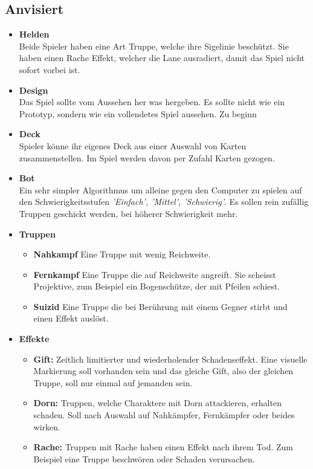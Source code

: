 \subsection*{Anvisiert}
\begin{itemize}
    \item \textbf{Helden} \\
        Beide Spieler haben eine Art Truppe, welche ihre Sigelinie beschützt. Sie haben einen Rache Effekt, welcher die
        Lane ausradiert, damit das Spiel nicht sofort vorbei ist.
    \item \textbf{Design} \\
        Das Spiel sollte vom Aussehen her was hergeben. Es sollte nicht wie ein Prototyp, sondern wie ein 
        vollendetes Spiel aussehen. Zu beginn
    \item \textbf{Deck} \\
        Spieler könne ihr eigenes Deck aus einer Auswahl von Karten zusammenstellen. Im Spiel werden davon per Zufahl Karten gezogen.
    \item \textbf{Bot} \\
        Ein sehr simpler Algorithmus um alleine gegen den Computer zu spielen auf den Schwierigkeitsstufen \textit{'Einfach', 'Mittel', 'Schwierig'}.
        Es sollen rein zufällig Truppen geschickt werden, bei höherer Schwierigkeit mehr.
    \item \textbf{Truppen}
    \begin{itemize}
        \item \textbf{Nahkampf}
            Eine Truppe mit wenig Reichweite.
        \item \textbf{Fernkampf}
            Eine Truppe die auf Reichweite angreift. Sie scheisst Projektive, zum Beispiel ein Bogenschütze,
            der mit Pfeilen schiest.
        \item \textbf{Suizid}
            Eine Truppe die bei Berührung mit einem Gegner stirbt und einen Effekt auslöst.
    \end{itemize}
    \item \textbf{Effekte}
    \begin{itemize}
        \item \textbf{Gift:}
            Zeitlich limitierter und wiederholender Schadenseffekt. Eine visuelle Markierung soll vorhanden sein
            und das gleiche Gift, also der gleichen Truppe, soll nur einmal auf jemanden sein.
        \item \textbf{Dorn:}
            Truppen, welche Charaktere mit Dorn attackieren, erhalten schaden. Soll nach Auswahl auf Nahkämpfer,
            Fernkämpfer oder beides wirken.
        \item \textbf{Rache:}
            Truppen mit Rache haben einen Effekt nach ihrem Tod. Zum Beispiel eine Truppe beschwören oder Schaden verursachen.
    \end{itemize}
\end{itemize}

